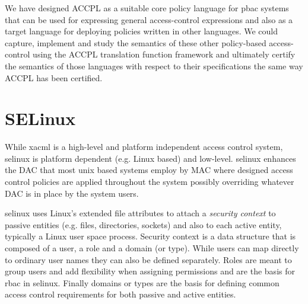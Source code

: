 %
%
%
%

 
We have designed \ac{ACCPL} as a suitable core policy language for \ac{pbac} systems that can be used for expressing general access-control expressions and also as a target language for deploying
policies written in other languages. We could capture, implement and study the semantics of these other policy-based access-control using the \ac{ACCPL} translation function framework and ultimately certify the semantics of those languages with respect to their specifications the same way \ac{ACCPL} has been certified.

\section{SELinux}

While \ac{xacml} is a high-level and platform independent access control system, \ac{selinux} is platform dependent (e.g. Linux based) and low-level. \ac{selinux} enhances the \ac{DAC} that most unix based systems employ by \ac{MAC} where designed access control policies are applied throughout the system possibly overriding whatever \ac{DAC} is in place by the system users. 

\ac{selinux} uses Linux's extended file attributes to attach a \emph{security context} to passive entities (e.g. files, directories, sockets) and also to each active entity, typically a Linux user space process. Security context is a data structure that is composed of a user, a role and a domain (or type). While users can map directly to ordinary user names they can also be defined separately. Roles are meant to group users and add flexibility when assigning permissions and are the basis for \ac{rbac} in \ac{selinux}. Finally domains or types are the basis for defining common access control requirements for both passive and active entities. 


